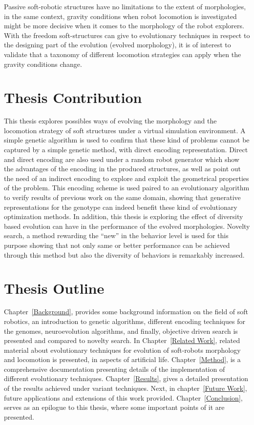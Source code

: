 Passive soft-robotic structures have no limitations to the extent of morphologies, in the same context, gravity conditions when robot locomotion is investigated might be more decisive when it comes to the morphology of the robot explorers. With the freedom soft-structures can give to evolutionary techniques in respect to the designing part of the evolution (evolved morphology), it is of interest to validate that a taxonomy of different locomotion strategies can apply when the gravity conditions change.



\section{Thesis Contribution}

This thesis explores possibles ways of evolving the morphology and the locomotion strategy of soft structures under a virtual simulation environment. A simple genetic algorithm is used to confirm that these kind of problems cannot be captured by a simple genetic method, with direct encoding representation. Direct and direct encoding are also used under a random robot generator which show the advantages of the encoding in the produced structures, as well as point out the need of an indirect encoding to explore and exploit the geometrical properties of the problem. This encoding scheme is used paired to an evolutionary algorithm to verify results of previous work on the same domain, showing that generative representations for the genotype can indeed benefit these kind of evolutionary optimization methods. In addition, this thesis is exploring the effect of diversity based evolution can have in the performance of the evolved morphologies. Novelty search, a method rewarding the ``new'' in the behavior level is used for this purpose showing that not only same or better performance can be achieved through this method but also the diversity of behaviors is remarkably increased. 






\section{Thesis Outline}

Chapter~\ref{Background}, provides some background information on the field of soft robotics, an introduction to genetic algorithms, different encoding techniques for the genomes, neuroevolution algorithms, and finally, objective driven search is presented and compared to novelty search. In Chapter~\ref{Related Work}, related material about evolutionary techniques for evolution of soft-robots morphology and locomotion is presented, in aspects of artificial life. Chapter~\ref{Method}, is a comprehensive documentation presenting details of the implementation of different evolutionary techniques. Chapter~\ref{Results}, gives a detailed presentation of the results achieved under variant techniques. Next, in chapter~\ref{Future Work}, future applications and extensions of this work provided. Chapter~\ref{Conclusion}, serves as an epilogue to this thesis, where some important points of it are presented.